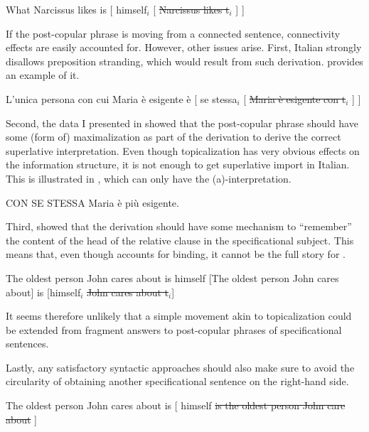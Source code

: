 \documentclass[output=paper,colorlinks,citecolor=brown,draft,draftmode]{langscibook}
\begin{document}
\ea  What Narcissus likes is [ himself$_i$ [ \sout{Narcissus likes t$_i$} ] ]
\z

If the post-copular phrase is moving from a connected sentence, connectivity effects are easily accounted for. However, other issues arise. First,  Italian strongly disallows preposition stranding, which would result from such derivation.   provides an example of it.

\ea \label{pstrand}L'unica persona con cui Maria è  esigente è [ se stessa$_i$ [ \sout{Maria è esigente con t$_i$} ] ]
\z

Second, the data I presented in  showed that the post-copular phrase should have some (form of) maximalization as part of the derivation to derive the correct superlative interpretation.
Even though topicalization has very obvious effects on the information structure, it
 is not enough to get superlative import in Italian. This is illustrated in  , which can only have the (a)-interpretation.


\newpage
\ea \label{topicalization}CON SE STESSA Maria è più esigente.
\z
\z



Third,   showed that the derivation should have some mechanism to ``remember'' the content of the head of the relative clause in the specificational subject. This means that, even though  accounts for binding, it cannot be the full story for .

\ea \ea \label{conclusion1}The oldest person John cares about is himself
\ex \label{conclusion2} [The oldest person John cares about] is [himself$_i$ \sout{John cares about t$_i$}]
\z
\z



It seems therefore unlikely that a simple movement akin to topicalization could be extended from fragment answers to post-copular phrases of specificational sentences.



Lastly, any satisfactory syntactic approaches should also make sure to avoid the circularity of obtaining another specificational sentence on the right-hand side.

\ea  The oldest person John cares about is  [ himself \sout{is the oldest person John care about} ]
\z

\sloppy
\printbibliography[heading=subbibliography,notkeyword=this]
\end{document}
